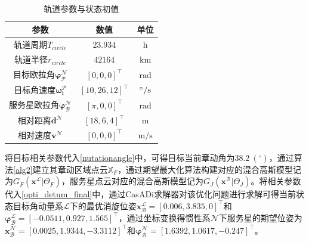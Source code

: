 \documentclass[lang=chs, degree=master, blindreview=false, winfonts=true]{yanputhesis}
\begin{document}
\begin{table}[!htb]
	\caption{轨道参数与状态初值}
	\label{Table_ini_para}
	\centering
	\begin{tabularx}{\textwidth}{CCC}
		\toprule
		参数 									      & 数值 					& 单位 					  \\
		\midrule
		轨道周期$T_{circle}$		&	$23.934$	    	&	$\mathrm{h}$		\\
		轨道半径$r_{circle}$		&	$42164$	    	&	$\mathrm{km}$		\\
		目标欧拉角$\boldsymbol{\varphi}_{\mathcal{P}}^{\mathcal{N}}$   &  ${\left[0,0,0\right]^{\top}}$   &  $\mathrm{rad}$  \\
		目标角速度$\boldsymbol{\omega}_t^{\mathcal{P}}$	    	&	${\left[10,26,12\right]^{\top}}$	      	&	$^\circ/{\rm s}$     \\
		服务星欧拉角$\boldsymbol{\varphi}_{\mathcal{B}}^{\mathcal{N}}$  &  ${\left[\pi,0,0\right]^{\top}}$   &  $\mathrm{rad}$  \\
		相对距离$\boldsymbol{d}^{\mathcal{N}}$  &  ${\left[18,6,4\right]^{\top}}$   &  $\mathrm{m}$  \\
		相对速度$\boldsymbol{v}^{\mathcal{N}}$     &  ${\left[0,0,0\right]^{\top}}$   &  $\mathrm{m/s}$  \\
		\bottomrule
	\end{tabularx}
\end{table}

将目标相关参数代入\autoref{nutationangle}中，可得目标当前章动角为$38.2\ (^\circ)$，通过算法\ref{alg2}建立其章动区域点云${\mathbb{X}_F}$，通过期望最大化算法构建对应的混合高斯模型记为${G_F}({{\boldsymbol{x}}^{\mathcal{L}}}|{\Theta _F})$，服务星点云对应的混合高斯模型记为${G_J}({{\boldsymbol{x}}^{\mathcal{B}}}|{\Theta _J})$。将相关参数代入\autoref{opti_detum_final}中，通过CasADi求解器\cite{Andersson2019}对该优化问题进行求解可得当前状态目标角动量系$\mathcal{L}$下的最优消旋位姿${\boldsymbol{x}}_{\mathcal{B}}^{\mathcal{L}}=\left[0.006,3.835,0\right]^{\top}$和${\boldsymbol{\varphi}}_{\mathcal{B}}^{\mathcal{L}}=\left[-0.0511,0.927,1.565\right]^{\top}$，通过坐标变换得惯性系$\mathcal{N}$下服务星的期望位姿为${\boldsymbol{x}}_{\mathcal{B}}^{\mathcal{N}}=\left[0.0025,1.9344,-3.3112\right]^{\top}$和${\boldsymbol{\varphi}}_{\mathcal{B}}^{\mathcal{N}}=\left[1.6392,1.0617,-0.247\right]^{\top}$。
\end{document}
